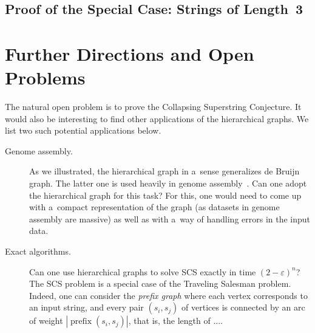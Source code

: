 \documentclass[11pt]{article}
\DeclareMathOperator{\prefix}{prefix}
\begin{document}




\subsection{Proof of the Special Case: Strings of Length~3}\label{subsec:scs3}
%


\section{Further Directions and Open Problems}
The natural open problem is to prove the Collapsing Superstring Conjecture.
It would also be interesting to find other applications of the 
hierarchical graphs. We list two such potential applications below.
\begin{description}
\item[Genome assembly.] As we illustrated, the hierarchical graph in a~sense
generalizes de Bruijn graph. The latter one is used heavily 
in genome assembly~\cite{pevzner2001eulerian}.
Can one adopt the hierarchical graph for this task? For this, one
would need to come up with a~compact representation of the graph
(as datasets in genome assembly are massive) as well as with a~way of
handling errors in the input data.

\item[Exact algorithms.] Can one use hierarchical graphs to solve SCS exactly in time $(2-\varepsilon)^n$?
The SCS problem is a special case of the Traveling Salesman problem. Indeed, one can consider the \emph{prefix graph} where each vertex corresponds to an input string, and every pair $(s_i, s_j)$ of vertices is connected by an arc of weight $|\prefix(s_i, s_j)|$, that is, the length of .... 
\end{description}



\end{document}
